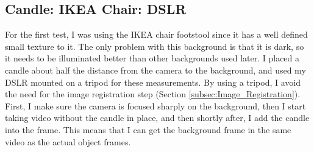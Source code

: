 \documentclass[letterpaper,12pt]{article}
\begin{document}
\subsection{Candle: IKEA Chair: DSLR}
\label{subsec:Candle_IKEA_Chair_DSLR}

For the first test, I was using the IKEA chair footstool since it has a well defined small texture to it.  The only problem with this background is that it is dark, so it needs to be illuminated better than other backgrounds used later.  I placed a candle about half the distance from the camera to the background, and used my DSLR mounted on a tripod for these measurements.  By using a tripod, I avoid the need for the image registration step (Section \ref{subsec:Image_Registration}).  First, I make sure the camera is focused sharply on the background, then I start taking video without the candle in place, and then shortly after, I add the candle into the frame.  This means that I can get the background frame in the same video as the actual object frames.
\end{document}
